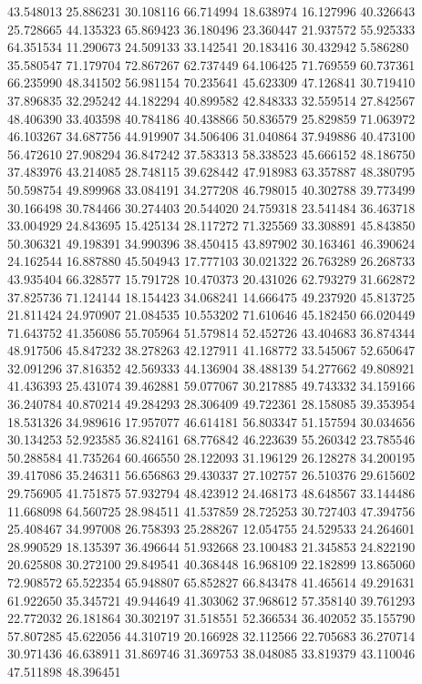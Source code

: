 43.548013
25.886231
30.108116
66.714994
18.638974
16.127996
40.326643
25.728665
44.135323
65.869423
36.180496
23.360447
21.937572
55.925333
64.351534
11.290673
24.509133
33.142541
20.183416
30.432942
5.586280
35.580547
71.179704
72.867267
62.737449
64.106425
71.769559
60.737361
66.235990
48.341502
56.981154
70.235641
45.623309
47.126841
30.719410
37.896835
32.295242
44.182294
40.899582
42.848333
32.559514
27.842567
48.406390
33.403598
40.784186
40.438866
50.836579
25.829859
71.063972
46.103267
34.687756
44.919907
34.506406
31.040864
37.949886
40.473100
56.472610
27.908294
36.847242
37.583313
58.338523
45.666152
48.186750
37.483976
43.214085
28.748115
39.628442
47.918983
63.357887
48.380795
50.598754
49.899968
33.084191
34.277208
46.798015
40.302788
39.773499
30.166498
30.784466
30.274403
20.544020
24.759318
23.541484
36.463718
33.004929
24.843695
15.425134
28.117272
71.325569
33.308891
45.843850
50.306321
49.198391
34.990396
38.450415
43.897902
30.163461
46.390624
24.162544
16.887880
45.504943
17.777103
30.021322
26.763289
26.268733
43.935404
66.328577
15.791728
10.470373
20.431026
62.793279
31.662872
37.825736
71.124144
18.154423
34.068241
14.666475
49.237920
45.813725
21.811424
24.970907
21.084535
10.553202
71.610646
45.182450
66.020449
71.643752
41.356086
55.705964
51.579814
52.452726
43.404683
36.874344
48.917506
45.847232
38.278263
42.127911
41.168772
33.545067
52.650647
32.091296
37.816352
42.569333
44.136904
38.488139
54.277662
49.808921
41.436393
25.431074
39.462881
59.077067
30.217885
49.743332
34.159166
36.240784
40.870214
49.284293
28.306409
49.722361
28.158085
39.353954
18.531326
34.989616
17.957077
46.614181
56.803347
51.157594
30.034656
30.134253
52.923585
36.824161
68.776842
46.223639
55.260342
23.785546
50.288584
41.735264
60.466550
28.122093
31.196129
26.128278
34.200195
39.417086
35.246311
56.656863
29.430337
27.102757
26.510376
29.615602
29.756905
41.751875
57.932794
48.423912
24.468173
48.648567
33.144486
11.668098
64.560725
28.984511
41.537859
28.725253
30.727403
47.394756
25.408467
34.997008
26.758393
25.288267
12.054755
24.529533
24.264601
28.990529
18.135397
36.496644
51.932668
23.100483
21.345853
24.822190
20.625808
30.272100
29.849541
40.368448
16.968109
22.182899
13.865060
72.908572
65.522354
65.948807
65.852827
66.843478
41.465614
49.291631
61.922650
35.345721
49.944649
41.303062
37.968612
57.358140
39.761293
22.772032
26.181864
30.302197
31.518551
52.366534
36.402052
35.155790
57.807285
45.622056
44.310719
20.166928
32.112566
22.705683
36.270714
30.971436
46.638911
31.869746
31.369753
38.048085
33.819379
43.110046
47.511898
48.396451
